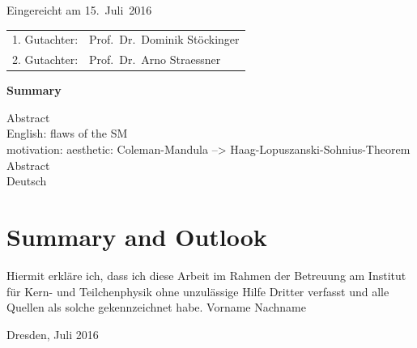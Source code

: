 \thispagestyle{empty}\vspace*{48em}
Eingereicht am 15.~Juli~2016\vspace{1.5em}
\par{\large\begin{tabular}{ll}
 1. Gutachter: & Prof.~Dr.~Dominik Stöckinger \\
 2. Gutachter: & Prof.~Dr.~Arno Straessner \\
\end{tabular}}
\newpage

\thispagestyle{empty}
\cleardoublepage

\begin{center}\large\bfseries Summary\end{center}
Abstract \\ 
English: flaws of the SM\\
motivation: aesthetic: Coleman-Mandula --> Haag-Lopuszanski-Sohnius-Theorem\\
\vspace{20em}
Abstract \\ 
Deutsch \\
\newpage

\thispagestyle{empty}
\cleardoublepage
 
\tableofcontents
\newpage


\newpage

\newpage

\newpage

\newpage

\newpage

\newpage

\newpage

\newpage
\section{Summary and Outlook}
\newpage

\newpage

\newpage
\clearpage
\thispagestyle{empty}
\vspace*{1.5em}
Hiermit erkläre ich, dass ich diese Arbeit im Rahmen der Betreuung am Institut
für Kern- und Teilchenphysik ohne unzulässige Hilfe Dritter verfasst und alle Quellen als solche gekennzeichnet habe.
\vspace*{45em}
Vorname Nachname \par
Dresden, Juli 2016


